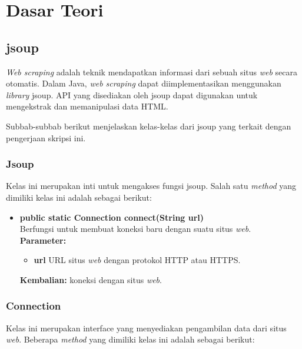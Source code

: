 \chapter{Dasar Teori}
\label{chap:Dasar Teori}

\section{jsoup}
\label{sec:jsoup}

\textit{Web scraping}\cite{Vargiu:2013} adalah teknik mendapatkan informasi dari sebuah situs \textit{web} secara otomatis. Dalam Java, \textit{web scraping} dapat diimplementasikan menggunakan \textit{library} jsoup\cite{jsoup}. API yang disediakan oleh jsoup dapat digunakan untuk mengekstrak dan memanipulasi data HTML. 

Subbab-subbab berikut menjelaskan kelas-kelas dari jsoup yang terkait dengan pengerjaan skripsi ini.

\subsection{Jsoup}

Kelas ini merupakan inti untuk mengakses fungsi jsoup. Salah satu \textit{method} yang dimiliki kelas ini adalah sebagai berikut:
\begin{itemize}
	\item \textbf{public static Connection connect(String url)} \\
		Berfungsi untuk membuat koneksi baru dengan suatu situs \textit{web}. \\
		\textbf{Parameter:}
		\begin{itemize}
			\item \textbf{url} URL situs \textit{web} dengan protokol HTTP atau HTTPS.
		\end{itemize}
		\textbf{Kembalian:} koneksi dengan situs \textit{web}.
\end{itemize}

\subsection{Connection}

Kelas ini merupakan interface yang menyediakan pengambilan data dari situs \textit{web}. Beberapa \textit{method} yang dimiliki kelas ini adalah sebagai berikut:

